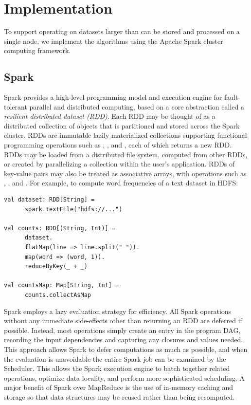 \section{Implementation}
\label{sec:implementation}

To support operating on datasets larger than can be stored and processed on a single node,
we implement the algorithms using the Apache Spark cluster computing framework.

\subsection{Spark}
Spark provides a high-level programming model and execution engine for
fault-tolerant parallel and distributed computing, based on a core 
abstraction called a \textit{resilient distributed dataset (RDD)}.
Each RDD may be thought of as a distributed collection of objects that is
partitioned and stored across the Spark cluster.
RDDs are immutable lazily materialized collections supporting functional
programming operations such as , , and ,
each of which returns a new RDD.
RDDs may be loaded from a distributed file system, computed from other RDDs,
or created by parallelizing a collection within the user's application.
RDDs of key-value pairs may also be treated as associative arrays, with
operations such as , , and .
For example, to compute word frequencies of a text dataset in HDFS:
\begin{verbatim}
val dataset: RDD[String] =
      spark.textFile("hdfs://...")

val counts: RDD[(String, Int)] =
      dataset.
      flatMap(line => line.split(" ")).
      map(word => (word, 1)).
      reduceByKey(_ + _)

val countsMap: Map[String, Int] =
      counts.collectAsMap
\end{verbatim}

Spark employs a lazy evaluation strategy for efficiency.
All Spark operations without any immediate side-effects other than returning an RDD are deferred
if possible.
Instead, most operations simply create an entry in the program DAG, recording the input
dependencies and capturing any closures and values needed.
This approach allows Spark to defer computations as much as possible, and when the evaluation
is unavoidable the entire Spark job can be examined by the Scheduler.
This allows the Spark execution engine to batch together related operations, optimize data locality,
and perform more sophisticated scheduling.
A major benefit of Spark over MapReduce is the use of in-memory caching and storage so that data structures
may be reused rather than being recomputed.



